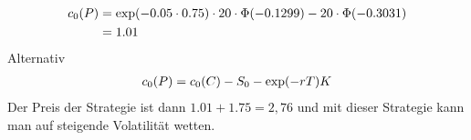 \documentclass{article}
\begin{document}
\begin{enumerate}[label=(\alph*)]
		\begin{align}
			c_0(P) &= \exp(-0.05\cdot 0.75)\cdot 20\cdot\Phi(-0.1299) - 20\cdot\Phi(-0.3031) \notag \\
			&= 1.01 \notag
		\end{align}
		Alternativ
		\begin{align}
			c_0(P) = c_0(C) - S_0 - \exp(-rT)K \notag
		\end{align}
		Der Preis der Strategie ist dann $1.01 + 1.75 = 2,76$ und mit dieser Strategie kann man auf steigende Volatilität wetten.
		\begin{center}
		\end{center}
	\end{enumerate}
\end{document}
